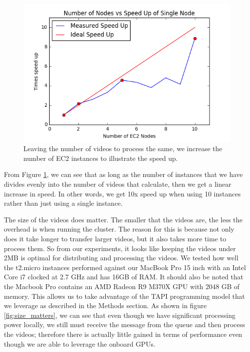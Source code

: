 \begin{figure}[h]
  \label{fig:speed_up}
  \centering
  \includegraphics[width=.8\textwidth]{figures/speed_up}
  \caption{Leaving the number of videos to process the same, we increase the
  number of EC2 instances to illustrate the speed up.}
\end{figure}

From Figure \ref{fig:speed_up}, we can see that as long as the number of instances
that we have divides evenly into the number of videos that calculate, then we
get a linear increase in speed. In other words, we get 10x speed up when using
10 instances rather than just using a single instance.

The size of the videos does matter. The smaller that the videos are, the less
the overhead is when running the cluster. The reason for this is because not only
does it take longer to transfer larger videos, but it also takes more time to process
them. So from our experiments, it looks like keeping the videos under 2MB is optimal
for distributing and processing the videos.
We tested how well the t2.micro instances performed against our MacBook Pro 15 inch
with an Intel Core i7 clocked at 2.7 GHz and has 16GB of RAM. It should also be
noted that the Macbook Pro contains an AMD Radeon R9 M370X GPU with 2048 GB of
memory. This allows us to take advantage of the TAPI programming model that
we leverage as described in the Methods section.  As shown in figure \ref{fig:size_matters},
we can see that even though we have significant processing power locally, we still
must receive the message from the queue and then process the videos; therefore
there is actually little gained in terms of performance even though we are able
to leverage the onboard GPUs.


